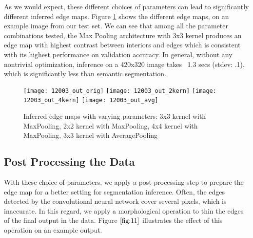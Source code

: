 \documentclass[10pt, twocolumn, twoside]{article}
\newcommand{\squeezeup}{\vspace{-2.5mm}}
\begin{document}
As we would expect, these different choices of parameters can lead to significantly different inferred edge maps. Figure \ref{fig:15} shows the different edge maps, on an example image from our test set. We can see that among all the parameter combinations tested, the Max Pooling architecture with 3x3 kernel produces an edge map with highest contrast between interiors and edges which is consistent with its highest performance on validation accuracy. In general, without any nontrivial optimization, inference on a 420x320 image takes ~1.3 secs (stdev: .1), which is significantly less than semantic segmentation. 


\begin{figure}[h!]
    \centering
    \texttt{[image: 12003\_out\_orig]}
    \texttt{[image: 12003\_out\_2kern]}
    \texttt{[image: 12003\_out\_4kern]}
    \texttt{[image: 12003\_out\_avg]}
    \caption{Inferred edge maps with varying parameters: 3x3 kernel with MaxPooling, 2x2 kernel with MaxPooling, 4x4 kernel with MaxPooling, 3x3 kernel with AveragePooling}
    \label{fig:15}
\end{figure}


\squeezeup
\squeezeup
\subsection{Post Processing the Data}
\squeezeup
With these choice of parameters, we apply a post-processing step to prepare the edge map for a better setting for segmentation inference. Often, the edges detected by the convolutional neural network cover several pixels, which is inaccurate. In this regard, we apply a morphological operation to thin the edges of the final output in the data. Figure $\ref{fig:11}$ illustrates the effect of this operation on an example output.
\end{document}
